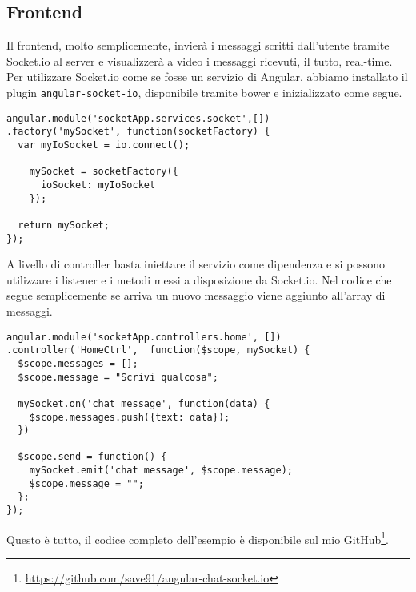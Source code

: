 \subsection{Frontend}
Il frontend, molto semplicemente, invierà i messaggi scritti dall'utente tramite Socket.io al server e visualizzerà a video i messaggi ricevuti, il tutto, real-time.
Per utilizzare Socket.io come se fosse un servizio di Angular, 
abbiamo installato il plugin \texttt{angular-socket-io}, disponibile tramite bower e inizializzato come segue.
\begin{lstlisting}[caption={service mySocket}, style=javaScriptCode]
angular.module('socketApp.services.socket',[])
.factory('mySocket', function(socketFactory) {
  var myIoSocket = io.connect();

    mySocket = socketFactory({
      ioSocket: myIoSocket
    });

  return mySocket;
});
\end{lstlisting} 
A livello di controller basta iniettare il servizio come dipendenza e si
possono utilizzare i listener e i metodi messi a disposizione da Socket.io.
Nel codice che segue semplicemente se arriva un nuovo messaggio viene aggiunto all'array di messaggi.
\begin{lstlisting}[caption={controller mySocket}, style=javaScriptCode]
angular.module('socketApp.controllers.home', [])
.controller('HomeCtrl',  function($scope, mySocket) {
  $scope.messages = [];
  $scope.message = "Scrivi qualcosa";

  mySocket.on('chat message', function(data) {
    $scope.messages.push({text: data});
  })

  $scope.send = function() {
    mySocket.emit('chat message', $scope.message);
    $scope.message = "";
  };
});
\end{lstlisting} 
Questo è tutto, il codice completo dell'esempio è disponibile sul mio GitHub\footnote{\url{https://github.com/save91/angular-chat-socket.io}}.



